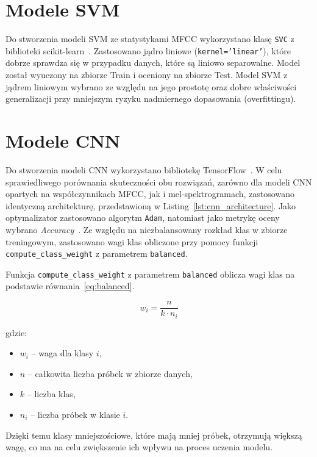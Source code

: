 \documentclass{SGGW-thesis}
\begin{document}
\section{Modele SVM}
Do stworzenia modeli SVM ze statystykami MFCC wykorzystano klasę \texttt{SVC} z biblioteki scikit-learn~\cite{pedregosa2011scikit}. Zastosowano jądro liniowe (\texttt{kernel='linear'}), które dobrze sprawdza się w przypadku danych, które są liniowo separowalne. Model został wyuczony na zbiorze Train i oceniony na zbiorze Test. Model SVM z jądrem liniowym wybrano ze względu na jego prostotę oraz dobre właściwości generalizacji przy mniejszym ryzyku nadmiernego dopasowania (overfittingu).

\section{Modele CNN} 
Do stworzenia modeli CNN wykorzystano bibliotekę  TensorFlow~\cite{abadi2016tensorflow}. W celu sprawiedliwego porównania skuteczności obu rozwiązań, zarówno dla modeli CNN opartych na współczynnikach MFCC, jak i mel-spektrogramach, zastosowano identyczną architekturę, przedstawioną w Listing~\ref{lst:cnn_architecture}. Jako optymalizator zastosowano algorytm \texttt{Adam}, natomiast jako metrykę oceny wybrano \textit{Accuracy}~\cite{goodfellow2016deep}. Ze względu na niezbalansowany rozkład klas w zbiorze treningowym, zastosowano wagi klas obliczone przy pomocy funkcji \texttt{compute\_class\_weight} z parametrem \texttt{balanced}.

Funkcja \texttt{compute\_class\_weight} z parametrem \texttt{balanced} oblicza wagi klas na podstawie równania~\ref{eq:balanced}.

\begin{equation}
w_i = \frac{n}{k \cdot n_i}
\label{eq:balanced}
\end{equation}

gdzie:
\begin{itemize}
    \renewcommand{\labelitemi}{}
    \item \( w_i \) – waga dla klasy \( i \),
    \item \( n \) – całkowita liczba próbek w zbiorze danych,
    \item \( k \) – liczba klas,
    \item \( n_i \) – liczba próbek w klasie \( i \).
\end{itemize}

Dzięki temu klasy mniejszościowe, które mają mniej próbek, otrzymują większą wagę, co ma na celu zwiększenie ich wpływu na proces uczenia modelu.
\end{document}
